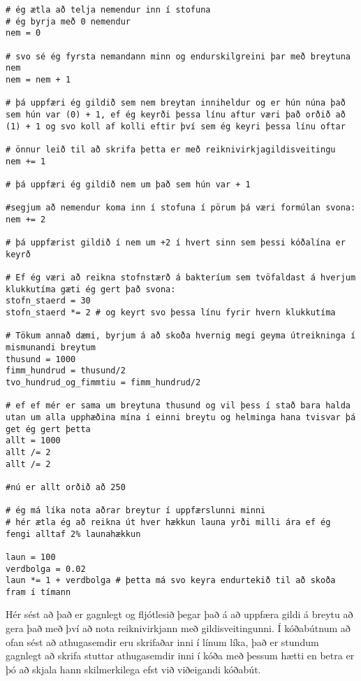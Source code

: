 \begin{lstlisting}[caption="Reiknivirkjagildisveiting", label=lst:reiknivirkjagildisveiting]
# ég ætla að telja nemendur inn í stofuna
# ég byrja með 0 nemendur
nem = 0

# svo sé ég fyrsta nemandann minn og endurskilgreini þar með breytuna nem
nem = nem + 1

# þá uppfæri ég gildið sem nem breytan inniheldur og er hún núna það sem hún var (0) + 1, ef ég keyrði þessa línu aftur væri það orðið að (1) + 1 og svo koll af kolli eftir því sem ég keyri þessa línu oftar

# önnur leið til að skrifa þetta er með reiknivirkjagildisveitingu
nem += 1

# þá uppfæri ég gildið nem um það sem hún var + 1

#segjum að nemendur koma inn í stofuna í pörum þá væri formúlan svona:
nem += 2

# þá uppfærist gildið í nem um +2 í hvert sinn sem þessi kóðalína er keyrð

# Ef ég væri að reikna stofnstærð á bakteríum sem tvöfaldast á hverjum klukkutíma gæti ég gert það svona:
stofn_staerd = 30
stofn_staerd *= 2 # og keyrt svo þessa línu fyrir hvern klukkutíma

# Tökum annað dæmi, byrjum á að skoða hvernig megi geyma útreikninga í mismunandi breytum
thusund = 1000
fimm_hundrud = thusund/2
tvo_hundrud_og_fimmtiu = fimm_hundrud/2

# ef ef mér er sama um breytuna thusund og vil þess í stað bara halda utan um alla upphæðina mína í einni breytu og helminga hana tvisvar þá get ég gert þetta
allt = 1000
allt /= 2
allt /= 2

#nú er allt orðið að 250

# ég má líka nota aðrar breytur í uppfærslunni minni
# hér ætla ég að reikna út hver hækkun launa yrði milli ára ef ég fengi alltaf 2% launahækkun

laun = 100
verdbolga = 0.02
laun *= 1 + verdbolga # þetta má svo keyra endurtekið til að skoða fram í tímann

\end{lstlisting}

Hér sést að það er gagnlegt og fljótlesið þegar það á að uppfæra gildi á breytu að gera það með því að nota reiknivirkjann með gildisveitingunni.
Í kóðabútnum að ofan sést að athugasemdir eru skrifaðar inni í línum líka, það er stundum gagnlegt að skrifa stuttar athugasemdir inni í kóða með þessum hætti en betra er þó að skjala hann skilmerkilega efst við viðeigandi kóðabút.

